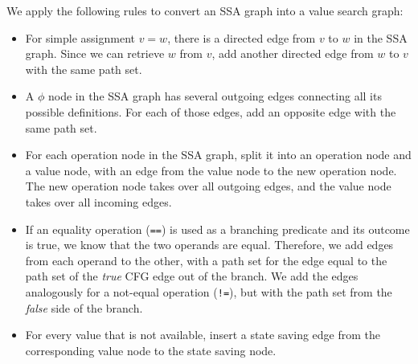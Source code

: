 \documentclass[12pt]{gatech-thesis}
\begin{document}
We apply the following rules to convert an SSA graph into a value search graph:
\begin{itemize}
	\item For simple assignment $v = w$, there is a directed edge from $v$ to $w$ in the SSA graph. 
	Since we can retrieve $w$ from $v$, add another directed edge from $w$ to $v$ with the same path set.

	\item A $\phi$ node in the SSA graph has several outgoing edges connecting all its possible definitions. 
	For each of those edges, add an opposite edge with the same path set. 
	
	\item For each operation node in the SSA graph, split it into an operation node and a value node, with an edge from the value node to the new operation node. 
	The new operation node takes over all outgoing edges, and the value node takes over all incoming edges. 
	
	\item If an equality operation (\texttt{==}) is used as a branching predicate and its outcome is true, we know that the two operands are equal.
	Therefore, we add edges from each operand to the other, with a path set for the edge equal to the path set of the \emph{true} CFG edge out of the branch. 
	We add the edges analogously for a not-equal operation (\texttt{!=}), but with the path set from the \emph{false} side of the branch.
	
	\item For every value that is not available, insert a state saving edge from the corresponding value node to the state saving node. 
\end{itemize}
\end{document}
